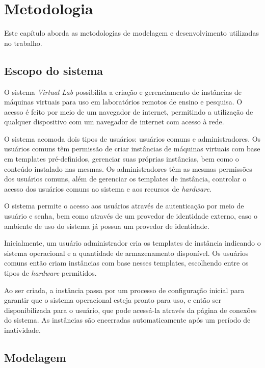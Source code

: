 
\chapter{Metodologia}
\label{cap:metodologia}

Este capítulo aborda as metodologias de modelagem e desenvolvimento utilizadas no trabalho.

\section{Escopo do sistema}
\label{sec:escopoDoSistema}

O sistema \textit{Virtual Lab} possibilita a criação e gerenciamento de instâncias de máquinas virtuais para uso em laboratórios remotos de ensino e pesquisa.
O acesso é feito por meio de um navegador de internet, permitindo a utilização de qualquer dispositivo com um navegador de internet com acesso à rede.

O sistema acomoda dois tipos de usuários: usuários comuns e administradores.
Os usuários comuns têm permissão de criar instâncias de máquinas virtuais com base em templates pré-definidos, gerenciar suas próprias instâncias, bem como o conteúdo instalado nas mesmas.
Os administradores têm as mesmas permissões dos usuários comuns, além de gerenciar os templates de instância, controlar o acesso dos usuários comuns ao sistema e aos recursos de \textit{hardware}.

O sistema permite o acesso aos usuários através de autenticação por meio de usuário e senha, bem como através de um provedor de identidade externo, caso o ambiente de uso do sistema já possua um provedor de identidade.

Inicialmente, um usuário administrador cria os templates de instância indicando o sistema operacional e a quantidade de armazenamento disponível.
Os usuários comuns então criam instâncias com base nesses templates, escolhendo entre os tipos de \textit{hardware} permitidos.

Ao ser criada, a instância passa por um processo de configuração inicial para garantir que o sistema operacional esteja pronto para uso, e então ser disponibilizada para o usuário, que pode acessá-la através da página de conexões do sistema. As instâncias são encerradas automaticamente após um período de inatividade.

\section{Modelagem}
\label{sec:modelagemDoSistema}

